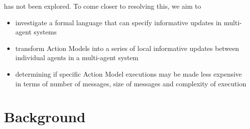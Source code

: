 has not been explored.
To come closer to resolving this, we aim to
\begin{itemize}
  \item investigate a formal language that can specify informative updates in
  multi-agent systems
  \item transform Action Models into a series of local informative updates
  between individual agents in a multi-agent system
  \item determining if specific Action Model executions may be made less expensive in
  terms of number of messages, size of messages and complexity of execution
\end{itemize}

\section{Background}

